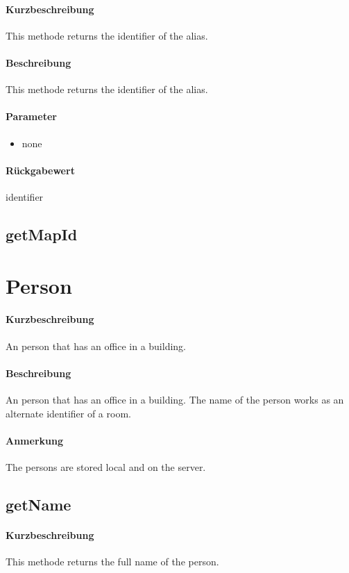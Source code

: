 \paragraph*{Kurzbeschreibung}
This methode returns the identifier of the alias.
\paragraph*{Beschreibung}
This methode returns the identifier of the alias.
\paragraph*{Parameter}
\begin{itemize}
    \item none
\end{itemize}
\paragraph*{Rückgabewert}
identifier

\subsection{getMapId}


\section{Person}
\paragraph*{Kurzbeschreibung}
An person that has an office in a building.
\paragraph*{Beschreibung}
An person that has an office in a building. The name of the person works as an alternate identifier of a room.
\paragraph*{Anmerkung}
The persons are stored local and on the server.

\subsection{getName}%
\paragraph*{Kurzbeschreibung}
This methode returns the full name of the person.
